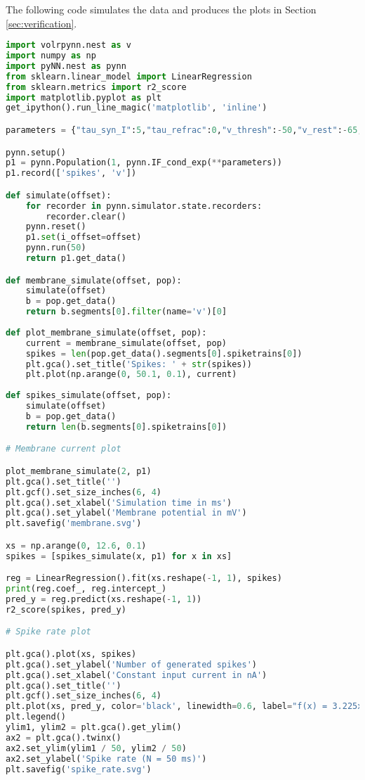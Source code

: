The following code simulates the data and produces the plots in Section \ref{sec:verification}.

\begin{lstlisting}[language=Python]
import volrpynn.nest as v
import numpy as np
import pyNN.nest as pynn
from sklearn.linear_model import LinearRegression
from sklearn.metrics import r2_score
import matplotlib.pyplot as plt
get_ipython().run_line_magic('matplotlib', 'inline')

parameters = {"tau_syn_I":5,"tau_refrac":0,"v_thresh":-50,"v_rest":-65,"tau_syn_E":5,"v_reset":-65,"tau_m":20,"e_rev_I":-70,"i_offset":0,"cm":1,"e_rev_E":0}

pynn.setup()
p1 = pynn.Population(1, pynn.IF_cond_exp(**parameters))
p1.record(['spikes', 'v'])

def simulate(offset):
    for recorder in pynn.simulator.state.recorders:
        recorder.clear()
    pynn.reset()
    p1.set(i_offset=offset)
    pynn.run(50)
    return p1.get_data()

def membrane_simulate(offset, pop):
    simulate(offset)
    b = pop.get_data()
    return b.segments[0].filter(name='v')[0]
    
def plot_membrane_simulate(offset, pop):
    current = membrane_simulate(offset, pop)
    spikes = len(pop.get_data().segments[0].spiketrains[0])
    plt.gca().set_title('Spikes: ' + str(spikes))
    plt.plot(np.arange(0, 50.1, 0.1), current)
    
def spikes_simulate(offset, pop):
    simulate(offset)
    b = pop.get_data()
    return len(b.segments[0].spiketrains[0])

# Membrane current plot

plot_membrane_simulate(2, p1)
plt.gca().set_title('')
plt.gcf().set_size_inches(6, 4)
plt.gca().set_xlabel('Simulation time in ms')
plt.gca().set_ylabel('Membrane potential in mV')
plt.savefig('membrane.svg')

xs = np.arange(0, 12.6, 0.1)
spikes = [spikes_simulate(x, p1) for x in xs]

reg = LinearRegression().fit(xs.reshape(-1, 1), spikes)
print(reg.coef_, reg.intercept_)
pred_y = reg.predict(xs.reshape(-1, 1))
r2_score(spikes, pred_y)

# Spike rate plot

plt.gca().plot(xs, spikes)
plt.gca().set_ylabel('Number of generated spikes')
plt.gca().set_xlabel('Constant input current in nA')
plt.gca().set_title('')
plt.gcf().set_size_inches(6, 4)
plt.plot(xs, pred_y, color='black', linewidth=0.6, label="f(x) = 3.225x - 1.615", linestyle="-.")
plt.legend()
ylim1, ylim2 = plt.gca().get_ylim()
ax2 = plt.gca().twinx()
ax2.set_ylim(ylim1 / 50, ylim2 / 50)
ax2.set_ylabel('Spike rate (N = 50 ms)')
plt.savefig('spike_rate.svg')


\end{lstlisting}
